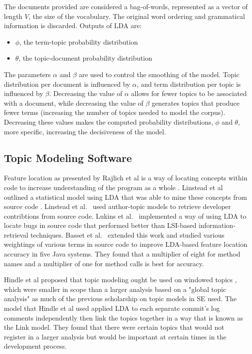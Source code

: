 The documents provided are considered a bag-of-words,
represented as a vector of length $V\!$, the size of the vocabulary.
The original word ordering and grammatical information is discarded.
Outputs of LDA are:
\begin{itemize}
\item $\phi$, the term-topic probability distribution
\item $\theta$, the topic-document probability distribution
\end{itemize}

The parameters $\alpha$ and $\beta$ are used to control the smoothing of the model.
Topic distribution per document is influenced by $\alpha$,
and term distribution per topic is influenced by $\beta$.
Decreasing the value of $\alpha$ allows for fewer topics to be associated with a document,
while decreasing the value of $\beta$ generates topics that produce fewer terms
(increasing the number of topics needed to model the corpus).
Decreasing these values makes the computed probability distributions, $\phi$ and $\theta$,
more specific, increasing the decisiveness of the model.

\subsection{Topic Modeling Software}

Feature location as presented by Rajlich et al
is a way of locating concepts within code to increase understanding of the program as a whole \cite{Rajlich2002}.
Linstead et al outlined a statistical model using LDA that was able to mine these concepts from source code \cite{Linstead2007_2}.
Linstead et al.~\cite{Linstead2007} used author-topic models to retrieve
developer contribtions from source code.
Lukins et al.~\cite{Lukins2008} implemented a way of using LDA to locate bugs in source
code that performed better than LSI-based information-retrieval
techniques.
Basset et al.~\cite{Bassett2013} extended this work
and studied various weightings of various terms in source code
to improve LDA-based feature location accuracy in five Java systems.
They found that a multiplier of eight for method names and a multiplier
of one for method calls is best for accuracy.

Hindle et al proposed that topic modeling ought be used on windowed topics \cite{Hindle2009}, which were smaller in scope than a larger analysis based on a "global topic analysis" as much of the previous scholarship on topic models in SE used.
The model that Hindle et al used applied LDA to each separate commit's log comments independently then link the topics together in a way that is known as the Link model.
They found that there were certain topics that would not register in a larger analysis but would be important at certain times in the development process.

